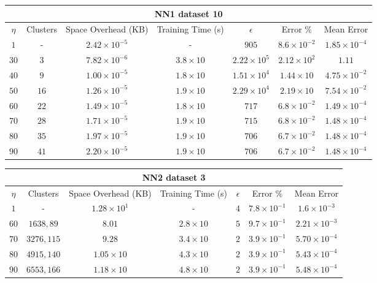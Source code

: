 \begin{adjustwidth}{-1cm}{}
\begin{tabular}{ccccccc}
\hline
\multicolumn{7}{c}{NN1 dataset 10} \\
\toprule
$\eta$ & Clusters & Space Overhead (KB) & Training Time (s) & $\epsilon$ & Error \% & Mean Error\\
\midrule
$1$ & - & $2.42 \times 10^{-5}$ & - & $905$ & $8.6 \times 10^{-2}$ & $1.85 \times 10^{-4}$\\
$30$ & $3$ & $7.82 \times 10^{-6}$ & $3.8 \times 10$ & $2.22 \times 10^5$ & $2.12 \times 10^2$ & $1.11$\\
$40$ & $9$ & $1.00 \times 10^{-5}$ & $1.8 \times 10$ & $1.51 \times 10^4$ & $1.44 \times 10$ & $4.75 \times 10^{-2}$\\
$50$ & $16$ & $1.26 \times 10^{-5}$ & $1.9 \times 10$ & $2.29 \times 10^4$ & $2.19 \times 10$ & $7.54 \times 10^{-2}$\\
$60$ & $22$ & $1.49 \times 10^{-5}$ & $1.8 \times 10$ & $717$ & $6.8 \times 10^{-2}$ & $1.49 \times 10^{-4}$\\
$70$ & $28$ & $1.71 \times 10^{-5}$ & $1.9 \times 10$ & $715$ & $6.8 \times 10^{-2}$ & $1.48 \times 10^{-4}$\\
$80$ & $35$ & $1.97 \times 10^{-5}$ & $1.9 \times 10$ & $706$ & $6.7 \times 10^{-2}$ & $1.48 \times 10^{-4}$\\
$90$ & $41$ & $2.20 \times 10^{-5}$ & $1.9 \times 10$ & $706$ & $6.7 \times 10^{-2}$ & $1.48 \times 10^{-4}$\\
\bottomrule
\end{tabular}
\end{adjustwidth}

\par\null\par
\par\null\par

\begin{adjustwidth}{-1cm}{}
\begin{tabular}{ccccccc}
\hline
\multicolumn{7}{c}{NN2 dataset 3} \\
\toprule
$\eta$ & Clusters & Space Overhead (KB) & Training Time (s) & $\epsilon$ & Error \% & Mean Error\\
\midrule
$1$ & - & $1.28 \times 10^{1}$ & - & $4$ & $7.8 \times 10^{-1}$ & $1.6 \times 10^{-3}$\\
$60$ & $1638, 89$ & $8.01$ & $2.8 \times 10$ & $5$ & $9.7 \times 10^{-1}$ & $2.21 \times 10^{-3}$\\
$70$ & $3276, 115$ & $9.28$ & $3.4 \times 10$ & $2$ & $3.9 \times 10^{-1}$ & $5.70 \times 10^{-4}$\\
$80$ & $4915, 140$ & $1.05 \times 10$ & $4.3 \times 10$ & $2$ & $3.9 \times 10^{-1}$ & $5.43 \times 10^{-4}$\\
$90$ & $6553, 166$ & $1.18 \times 10$ & $4.8 \times 10$ & $2$ & $3.9 \times 10^{-1}$ & $5.48 \times 10^{-4}$\\
\bottomrule
\end{tabular}
\end{adjustwidth}

